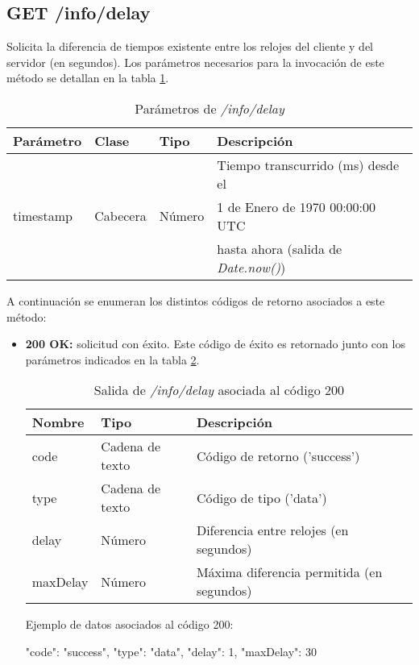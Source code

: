 %
%
\subsection{GET /info/delay}
Solicita la diferencia de tiempos existente entre los relojes del cliente y del servidor (en segundos). Los parámetros necesarios para la invocación de este método se detallan en la tabla \ref{extra:api:infodelay:invocacion}.

\begin{table}[H]
\centering
\begin{tabular}{|l|l|l|l|}
\hline
\rowcolor[HTML]{F5F5F5}
\textbf{Parámetro}  & \textbf{Clase} & \textbf{Tipo}   & \textbf{Descripción}                         \\ \hline
                    &                &                 & Tiempo transcurrido (ms) desde el            \\
timestamp           & Cabecera       & Número          & 1 de Enero de 1970 00:00:00 UTC              \\
                    &                &                 & hasta ahora (salida de \textit{Date.now()})  \\ \hline
\end{tabular}
\caption{Parámetros de \textit{/info/delay}}
\label{extra:api:infodelay:invocacion}
\end{table}

A continuación se enumeran los distintos códigos de retorno asociados a este método:
\begin{itemize}

\item{\textbf{200 OK:} solicitud con éxito. Este código de éxito es retornado junto con los parámetros indicados en la tabla \ref{extra:api:infodelay:ok}.
\begin{table}[H]
\centering
\begin{tabular}{|l|l|l|}
\hline
\rowcolor[HTML]{F5F5F5}
\textbf{Nombre}  & \textbf{Tipo}   & \textbf{Descripción}                      \\ \hline
code             & Cadena de texto & Código de retorno ('success')             \\ \hline
type             & Cadena de texto & Código de tipo ('data')                   \\ \hline
delay            & Número          & Diferencia entre relojes (en segundos)    \\ \hline
maxDelay         & Número          & Máxima diferencia permitida (en segundos) \\ \hline
\end{tabular}
\caption{Salida de \textit{/info/delay} asociada al código 200}
\label{extra:api:infodelay:ok}
\end{table}
\begin{minipage}{\textwidth}
Ejemplo de datos asociados al código 200:

\begin{code}[language=json]
 {
   "code": "success",
   "type": "data",
   "delay": 1,
   "maxDelay": 30
 }
\end{code}
\end{minipage}
}

\end{itemize}

